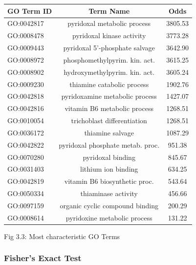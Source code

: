 \documentclass[10pt,twocolumn,letterpaper]{article}
\begin{document}
\begin{center}
    \begin{tabular}{lcc}
        \toprule
        GO Term ID & Term Name & Odds \\
        \midrule
        GO:0042817	& \small{pyridoxal metabolic process} &	3805.53 \\
        GO:0008478	& \small{pyridoxal kinase activity} &	3773.28 \\
        GO:0009443	& \small{pyridoxal 5'-phosphate salvage} &	3642.90 \\
        GO:0008972	& \small{phosphomethylpyrim. kin. act.} &	3615.25 \\
        GO:0008902	& \small{hydroxymethylpyrim. kin. act.} &	3605.24 \\
        GO:0009230	& \small{thiamine catabolic process} &	1902.76 \\
        GO:0042818	& \small{pyridoxamine metabolic process} &	1427.07\\
        GO:0042816	& \small{vitamin B6 metabolic process} &	1268.51\\
        GO:0010054	& \small{trichoblast differentiation} &	1268.51 \\
        GO:0036172	& \small{thiamine salvage} &	1087.29 \\
        GO:0042822	& \small{pyridoxal phosphate metab. proc.} &	951.38 \\
        GO:0070280	& \small{pyridoxal binding} &	845.67 \\
        GO:0031403	& \small{lithium ion binding} &	634.25 \\
        GO:0042819	& \small{vitamin B6 biosynthetic proc.} &	543.64 \\
        GO:0050334	& \small{thiaminase activity} &	456.66 \\
        GO:0097159	& \small{organic cyclic compound binding} &	200.29 \\
        GO:0008614	& \small{pyridoxine metabolic process} &	131.22 \\
        \bottomrule
    \end{tabular}
\end{center} 
\begin{center}
    \small{Fig 3.3: Most characteristic GO Terms}
\end{center}

\subsubsection{Fisher's Exact Test}
\end{document}
